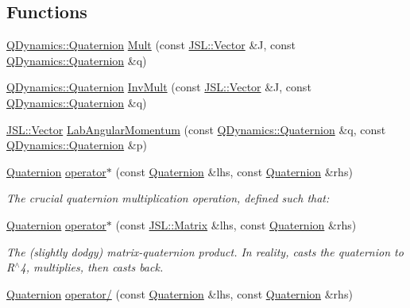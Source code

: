 \subsection*{Functions}
\begin{DoxyCompactItemize}
\item 
\hyperlink{classQDynamics_1_1Quaternion}{Q\+Dynamics\+::\+Quaternion} \hyperlink{namespaceQDynamics_a0b043bd2021eaeb8b6580cef4fcc667c}{Mult} (const \hyperlink{classJSL_1_1Vector}{J\+S\+L\+::\+Vector} \&J, const \hyperlink{classQDynamics_1_1Quaternion}{Q\+Dynamics\+::\+Quaternion} \&q)
\item 
\hyperlink{classQDynamics_1_1Quaternion}{Q\+Dynamics\+::\+Quaternion} \hyperlink{namespaceQDynamics_a78137919461ac257fe032f870771b0ed}{Inv\+Mult} (const \hyperlink{classJSL_1_1Vector}{J\+S\+L\+::\+Vector} \&J, const \hyperlink{classQDynamics_1_1Quaternion}{Q\+Dynamics\+::\+Quaternion} \&q)
\item 
\hyperlink{classJSL_1_1Vector}{J\+S\+L\+::\+Vector} \hyperlink{namespaceQDynamics_a4eabde69f542fcca92f97b1ef2e28b33}{Lab\+Angular\+Momentum} (const \hyperlink{classQDynamics_1_1Quaternion}{Q\+Dynamics\+::\+Quaternion} \&q, const \hyperlink{classQDynamics_1_1Quaternion}{Q\+Dynamics\+::\+Quaternion} \&p)
\item 
\hyperlink{classQDynamics_1_1Quaternion}{Quaternion} \hyperlink{namespaceQDynamics_ac40010112506831ced816640def9bc85}{operator$\ast$} (const \hyperlink{classQDynamics_1_1Quaternion}{Quaternion} \&lhs, const \hyperlink{classQDynamics_1_1Quaternion}{Quaternion} \&rhs)
\begin{DoxyCompactList}\small\item\em The crucial quaternion multiplication operation, defined such that\+: \end{DoxyCompactList}\item 
\hyperlink{classQDynamics_1_1Quaternion}{Quaternion} \hyperlink{namespaceQDynamics_a3382c10ce708c163d79c9fdb5c79b452}{operator$\ast$} (const \hyperlink{classJSL_1_1Matrix}{J\+S\+L\+::\+Matrix} \&lhs, const \hyperlink{classQDynamics_1_1Quaternion}{Quaternion} \&rhs)
\begin{DoxyCompactList}\small\item\em The (slightly dodgy) matrix-\/quaternion product. In reality, casts the quaternion to R$^\wedge$4, multiplies, then casts back. \end{DoxyCompactList}\item 
\hyperlink{classQDynamics_1_1Quaternion}{Quaternion} \hyperlink{namespaceQDynamics_a48d51b6fed1449d7e9a62dac20a169af}{operator/} (const \hyperlink{classQDynamics_1_1Quaternion}{Quaternion} \&lhs, const \hyperlink{classQDynamics_1_1Quaternion}{Quaternion} \&rhs)

\end{DoxyCompactItemize}
